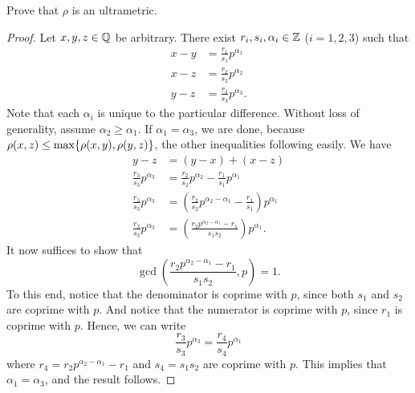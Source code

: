 \begin{majorEx}
    Prove that $\rho$ is an ultrametric.
\end{majorEx}

\begin{proof}
    Let $x, y, z \in \mathbb{Q}$ be arbitrary. There exist $r_i, s_i, \alpha_i \in \mathbb{Z}$
    ($i = 1, 2, 3$) such that
    \begin{align*}
        x - y &= \frac{r_1}{s_1} p^{\alpha_1} \\
        x - z &= \frac{r_2}{s_2} p^{\alpha_2} \\
        y - z &= \frac{r_3}{s_3} p^{\alpha_3}.
    \end{align*}
    Note that each $\alpha_i$ is unique to the particular difference.
    Without loss of generality, assume $\alpha_2 \geq \alpha_1$. If $\alpha_1 =
    \alpha_3$, we are done, because $\rho(x,z) \leq \max\{\rho(x,y), \rho(y,z)\}$,
    the other inequalities following easily. We have
    \begin{align*}
        y - z &= (y - x) + (x - z) \\
        \frac{r_3}{s_3}p^{\alpha_3} &= \frac{r_2}{s_2} p^{\alpha_2} -
        \frac{r_1}{s_1} p^{\alpha_1} \\
        \frac{r_3}{s_3}p^{\alpha_3} &= \left(\frac{r_2}{s_2} p^{\alpha_2 -
        \alpha_1} - \frac{r_1}{s_1} \right) p^{\alpha_1} \\
        \frac{r_3}{s_3}p^{\alpha_3} &= \left(\frac{r_2p^{\alpha_2 -
        \alpha_1} - r_1}{s_1s_2} \right) p^{\alpha_1}.
     \end{align*}
     It now suffices to show that 
     \[
         \gcd \left(\frac{r_2p^{\alpha_2 - \alpha_1} - r_1}{s_1s_2},
         p \right) = 1.
     \]
     To this end, notice that the denominator is coprime with $p$, since both
     $s_1$ and $s_2$ are coprime with $p$. And notice that the numerator is
     coprime with $p$, since $r_1$ is coprime with $p$. Hence, we can write
     \[
         \frac{r_3}{s_3}p^{\alpha_3} = \frac{r_4}{s_4} p^{\alpha_1}
     \]
     where $r_4 = r_2 p^{\alpha_2 - \alpha_1} - r_1$ and $s_4 = s_1 s_2$ are
     coprime with $p$. This implies that $\alpha_1 = \alpha_3$, and the result
     follows.
\end{proof}
